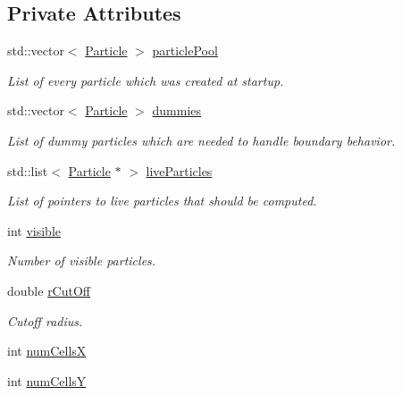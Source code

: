 \subsection*{Private Attributes}
\begin{DoxyCompactItemize}
\item 
std\-::vector$<$ \hyperlink{classSimulation_1_1Particle}{Particle} $>$ \hyperlink{classSimulation_1_1ParticleContainer_a45869e923d4b355d3be609ec78235bf0}{particle\-Pool}
\begin{DoxyCompactList}\small\item\em List of every particle which was created at startup. \end{DoxyCompactList}\item 
std\-::vector$<$ \hyperlink{classSimulation_1_1Particle}{Particle} $>$ \hyperlink{classSimulation_1_1ParticleContainer_af7710cc9a30897b05c4dae5610562f2e}{dummies}
\begin{DoxyCompactList}\small\item\em List of dummy particles which are needed to handle boundary behavior. \end{DoxyCompactList}\item 
std\-::list$<$ \hyperlink{classSimulation_1_1Particle}{Particle} $\ast$ $>$ \hyperlink{classSimulation_1_1ParticleContainer_a851707b9ea1f91a934e7eda5e219b97d}{live\-Particles}
\begin{DoxyCompactList}\small\item\em List of pointers to live particles that should be computed. \end{DoxyCompactList}\item 
int \hyperlink{classSimulation_1_1ParticleContainer_a3e3805eea543d96c5cf6ced07b9c2e7b}{visible}
\begin{DoxyCompactList}\small\item\em Number of visible particles. \end{DoxyCompactList}\item 
double \hyperlink{classSimulation_1_1ParticleContainer_a1f0e9467546c765bf8533a307b5587e1}{r\-Cut\-Off}
\begin{DoxyCompactList}\small\item\em Cutoff radius. \end{DoxyCompactList}\item 
int \hyperlink{classSimulation_1_1ParticleContainer_a26ff75d3f5c109fc354bb95e460bef20}{num\-Cells\-X}
\item 
int \hyperlink{classSimulation_1_1ParticleContainer_ae248a9742a4d62f0cc692214eef9ba63}{num\-Cells\-Y}

\end{DoxyCompactItemize}
